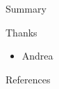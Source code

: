 \documentclass[aspectratio=169,12pt]{beamer} %
\begin{document}
\begin{frame}{Summary}
\end{frame}

\begin{frame}{Thanks}
    \begin{itemize}
        \item Andrea
    \end{itemize}
\end{frame}

\begin{frame}{References}
%        
%        
        \tiny
        
\end{frame}
\end{document}
